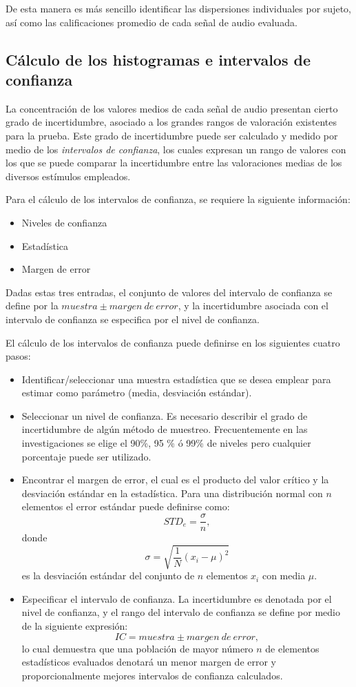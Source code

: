 De esta manera es más sencillo identificar las dispersiones individuales por sujeto, así como las calificaciones promedio de cada señal de audio evaluada. 
\subsection{Cálculo de los histogramas e intervalos de confianza}
La concentración de los valores medios de cada señal de audio presentan cierto grado de incertidumbre, asociado a los grandes rangos de valoración existentes para la prueba. Este grado de incertidumbre puede ser calculado y medido por medio de los \emph{intervalos de confianza}, los cuales expresan un rango de valores con los que se puede comparar la incertidumbre entre las valoraciones medias de los diversos estímulos empleados. 

Para el cálculo de los intervalos de confianza, se requiere la siguiente información:
\begin{itemize}
	\item Niveles de confianza
	\item Estadística
	\item Margen de error
\end{itemize}
Dadas estas tres entradas, el conjunto de valores del intervalo de confianza se define por la $muestra \pm margen~de~error$, y la incertidumbre asociada con el intervalo de confianza se especifica por el nivel de confianza.

El cálculo de los intervalos de confianza puede definirse en los siguientes cuatro pasos:
\begin{itemize}
	\item Identificar/seleccionar una muestra estadística que se desea emplear para estimar como parámetro (media, desviación estándar).
	\item Seleccionar un nivel de confianza. Es necesario describir el grado de incertidumbre de algún método de muestreo. Frecuentemente en las investigaciones se elige el 90\%, 95 \% ó 99\% de niveles pero cualquier porcentaje puede ser utilizado.
	\item Encontrar el margen de error, el cual es el producto del valor crítico y la desviación estándar en la estadística. Para una distribución normal con $n$ elementos el error estándar puede definirse como:
		\begin{equation}
		STD_{e}  = \frac{\sigma}{n},
	\end{equation}
donde $$\sigma=\sqrt{\frac{1}{N}(x_{i}-\mu)^2}$$ 
es la desviación estándar del conjunto de $n$ elementos $x_{i}$ con media $\mu$.
	\item Especificar el intervalo de confianza. La incertidumbre es denotada por el nivel de confianza, y el rango del intervalo de confianza se define por medio de la siguiente expresión:
	\begin{equation}
		IC = muestra  \pm margen~de~error,
	\end{equation}
	lo cual demuestra que una población de mayor número $n$ de elementos estadísticos evaluados denotará un menor margen de error y proporcionalmente mejores intervalos de confianza calculados.
\end{itemize}


